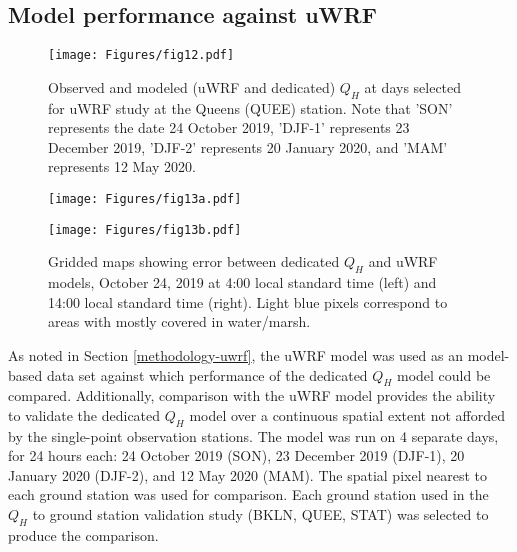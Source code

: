 \FloatBarrier

\subsection{Model performance against uWRF}

\begin{figure}[!h]
    \centering
        \texttt{[image: Figures/fig12.pdf]}
        \caption[short for lof]{Observed and modeled (uWRF and dedicated) $Q_H$ at days selected for uWRF study at the Queens (QUEE) station. Note that 'SON' represents the date 24 October 2019, 'DJF-1' represents 23 December 2019, 'DJF-2' represents 20 January 2020, and 'MAM' represents 12 May 2020.}
    \label{fig:wrf-timeseries}
\end{figure}

\begin{figure}[!h]
    \centering
    \begin{minipage}{0.455\textwidth}
        \centering
        \texttt{[image: Figures/fig13a.pdf]} %
    \end{minipage}\hfill
    \begin{minipage}{0.545\textwidth}
        \centering
        \texttt{[image: Figures/fig13b.pdf]} %
    \end{minipage}\hfill
    \caption{Gridded maps showing error between dedicated $Q_H$ and uWRF models, October 24, 2019 at 4:00 local standard time (left) and 14:00 local standard time (right). Light blue pixels correspond to areas with mostly covered in water/marsh.}
    \label{fig:wrf-meshgrid}
\end{figure}

As noted in Section \ref{methodology-uwrf}, the uWRF model was used as an model-based data set against which performance of the dedicated $Q_H$ model could be compared. Additionally, comparison with the uWRF model provides the ability to validate the dedicated $Q_H$ model over a continuous spatial extent not afforded by the single-point observation stations. The model was run on 4 separate days, for 24 hours each: 24 October 2019 (SON), 23 December 2019 (DJF-1), 20 January 2020 (DJF-2), and 12 May 2020 (MAM). The spatial pixel nearest to each ground station was used for comparison. Each ground station used in the $Q_H$ to ground station validation study (BKLN, QUEE, STAT) was selected to produce the comparison.

